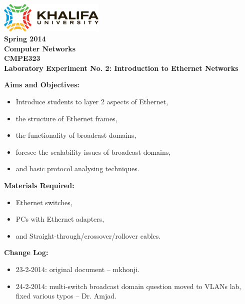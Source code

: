 \documentclass[pdftex,12pt,a4paper]{article}
\begin{document}
    \begin{titlepage}
        \begin{center}
            \includegraphics[width=5cm]{figures/kulogo}\\[1cm]
            {\Large \bfseries
                Spring 2014\\
                Computer Networks\\
                CMPE323\\[1cm]
            }
            {\large \bfseries
                \noindent Laboratory Experiment No. 2: Introduction to Ethernet
                Networks\\[1cm]
            }
        \end{center}

        \noindent \textbf{Aims and Objectives:}
            \begin{itemize}[leftmargin=4cm]
                \item Introduce students to layer 2 aspects of Ethernet,
                \item the structure of Ethernet frames,
                \item the functionality of broadcast domains,
                \item foresee the scalability issues of broadcast domains,
                \item and basic protocol analysing techniques.
            \end{itemize}
            \vspace{0.5cm}

        \noindent \textbf{Materials Required:}
            \begin{itemize}[leftmargin=4cm]
                \item Ethernet switches,
                \item PCs with Ethernet adapters,
                \item and Straight-through/crossover/rollover cables.
            \end{itemize}
            \vspace{0.5cm}

        \noindent \textbf{Change Log:}
            \begin{itemize}[leftmargin=4cm]
                \item 23-2-2014: original document -- mkhonji.
                \item 24-2-2014: multi-switch broadcast domain question moved
                    to VLANs lab, fixed various typos -- Dr. Amjad.
            \end{itemize}
    \end{titlepage}
    \newpage
\end{document}
